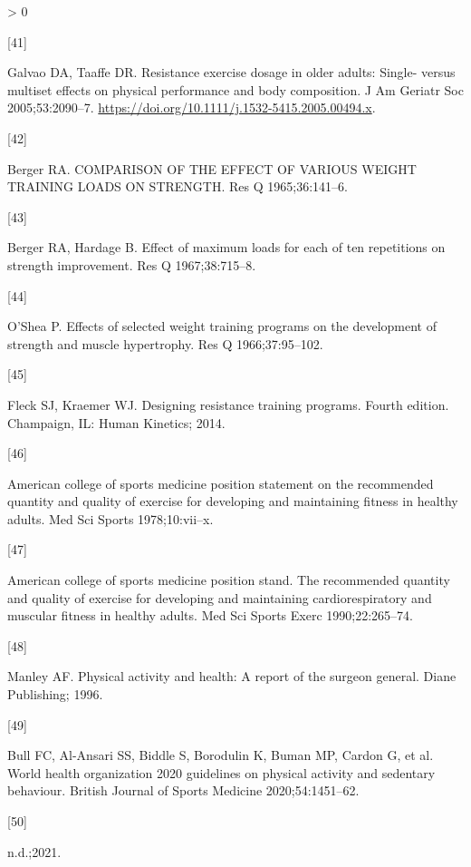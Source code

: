 \documentclass[twoside,10pt]{gihclass} %
\newlength{\cslhangindent}
\newlength{\csllabelwidth}
\newenvironment{CSLReferences}[3] %
 {%
  \setlength{\parindent}{0pt}
  \ifodd #1 \everypar{\setlength{\hangindent}{\cslhangindent}}\ignorespaces\fi
  \ifnum #2 > 0
  \setlength{\parskip}{#2\baselineskip}
  \fi
 }%
 {}
\newcommand{\CSLLeftMargin}[1]{\parbox[t]{\maxof{\widthof{#1}}{\csllabelwidth}}{#1}}
\newcommand{\CSLRightInline}[1]{\parbox[t]{\linewidth}{#1}}
\begin{document}
\begin{CSLReferences}{0}{0}
\leavevmode\hypertarget{ref-RN1472}{}%
\CSLLeftMargin{{[}41{]} }
\CSLRightInline{Galvao DA, Taaffe DR. Resistance exercise dosage in older adults: Single- versus multiset effects on physical performance and body composition. J Am Geriatr Soc 2005;53:2090--7. \url{https://doi.org/10.1111/j.1532-5415.2005.00494.x}.}

\leavevmode\hypertarget{ref-RN2659}{}%
\CSLLeftMargin{{[}42{]} }
\CSLRightInline{Berger RA. COMPARISON OF THE EFFECT OF VARIOUS WEIGHT TRAINING LOADS ON STRENGTH. Res Q 1965;36:141--6.}

\leavevmode\hypertarget{ref-RN2658}{}%
\CSLLeftMargin{{[}43{]} }
\CSLRightInline{Berger RA, Hardage B. Effect of maximum loads for each of ten repetitions on strength improvement. Res Q 1967;38:715--8.}

\leavevmode\hypertarget{ref-RN2656}{}%
\CSLLeftMargin{{[}44{]} }
\CSLRightInline{O'Shea P. Effects of selected weight training programs on the development of strength and muscle hypertrophy. Res Q 1966;37:95--102.}

\leavevmode\hypertarget{ref-RN2537}{}%
\CSLLeftMargin{{[}45{]} }
\CSLRightInline{Fleck SJ, Kraemer WJ. Designing resistance training programs. Fourth edition. Champaign, IL: Human Kinetics; 2014.}

\leavevmode\hypertarget{ref-RN2655}{}%
\CSLLeftMargin{{[}46{]} }
\CSLRightInline{American college of sports medicine position statement on the recommended quantity and quality of exercise for developing and maintaining fitness in healthy adults. Med Sci Sports 1978;10:vii--x.}

\leavevmode\hypertarget{ref-RN2654}{}%
\CSLLeftMargin{{[}47{]} }
\CSLRightInline{American college of sports medicine position stand. The recommended quantity and quality of exercise for developing and maintaining cardiorespiratory and muscular fitness in healthy adults. Med Sci Sports Exerc 1990;22:265--74.}

\leavevmode\hypertarget{ref-RN2666}{}%
\CSLLeftMargin{{[}48{]} }
\CSLRightInline{Manley AF. Physical activity and health: A report of the surgeon general. Diane Publishing; 1996.}

\leavevmode\hypertarget{ref-RN2667}{}%
\CSLLeftMargin{{[}49{]} }
\CSLRightInline{Bull FC, Al-Ansari SS, Biddle S, Borodulin K, Buman MP, Cardon G, et al. World health organization 2020 guidelines on physical activity and sedentary behaviour. British Journal of Sports Medicine 2020;54:1451--62.}

\leavevmode\hypertarget{ref-RN2696}{}%
\CSLLeftMargin{{[}50{]} }
\CSLRightInline{n.d.;2021.}


\end{CSLReferences}
\end{document}
